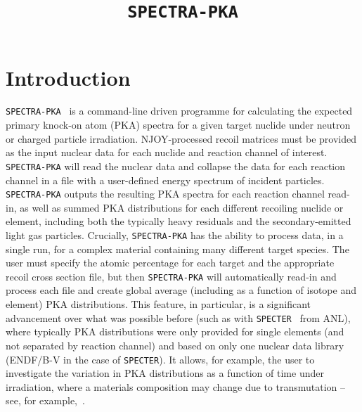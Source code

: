 \documentclass[a4paper]{article}
\begin{document}
\title{\texttt{SPECTRA-PKA}}

\maketitle
\section{Introduction}
\texttt{SPECTRA-PKA}~\cite{gilbertmariansublet2015,gilbertsubletNME2016,gilbertsublet2018,spectrapkaavailablefrom} is a command-line driven programme for calculating the expected primary knock-on atom (PKA) spectra for a given target nuclide under neutron or charged particle irradiation. NJOY-processed recoil matrices must be provided as the input nuclear data for each nuclide and reaction channel of interest. \texttt{SPECTRA-PKA} will read the nuclear data and collapse the data for each reaction channel in a file with a user-defined energy spectrum of incident particles. \texttt{SPECTRA-PKA} outputs the resulting PKA spectra for each reaction channel read-in, as well as summed PKA distributions for each different recoiling nuclide or element, including both the typically heavy residuals and the secondary-emitted light gas particles. Crucially, \texttt{SPECTRA-PKA} has the ability to process data, in a single run, for a complex material containing many different target species. The user must specify the atomic percentage for each target and the appropriate recoil cross section file, but then \texttt{SPECTRA-PKA} will automatically read-in and process each file and create global average (including as a function of isotope and element) PKA distributions. This feature, in particular, is a significant advancement over what was possible before (such as with \texttt{SPECTER}~\cite{specter} from ANL), where typically PKA distributions were only provided for single elements (and not separated by reaction channel) and based on only one nuclear data library (ENDF/B-V in the case of \texttt{SPECTER}). It allows, for example, the user to investigate the variation in PKA distributions as a function of time under irradiation, where a materials composition may change due to transmutation -- see, for example,~\cite{gilbertsubletNME2016}.
\end{document}
